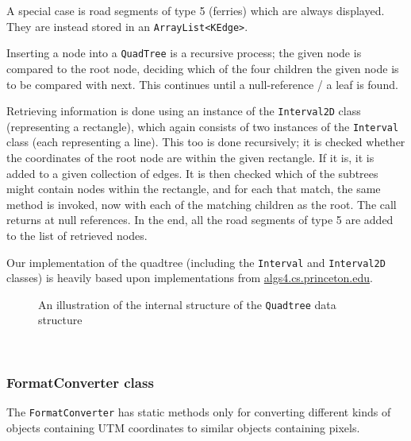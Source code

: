 A special case is road segments of type 5 (ferries) which are always displayed. They are instead stored in an \texttt{ArrayList<KEdge>}.

Inserting a node into a \texttt{QuadTree} is a recursive process; the given node is compared to the root node, deciding which of the four children the given node is to be compared with next. This continues until a null-reference / a leaf is found.

Retrieving information is done using an instance of the \texttt{Interval2D} class (representing a rectangle), which again consists of two instances of the \texttt{Interval} class (each representing a line). This too is done recursively; it is checked whether the coordinates of the root node are within the given rectangle. If it is, it is added to a given collection of edges. It is then checked which of the subtrees might contain nodes within the rectangle, and for each that match, the same method is invoked, now with each of the matching children as the root. The call returns at null references. In the end, all the road segments of type 5 are added to the list of retrieved nodes.

Our implementation of the quadtree (including the \texttt{Interval} and \texttt{Interval2D} classes) is heavily based upon implementations from \url{algs4.cs.princeton.edu}.
\\
\begin{figure}[!h]
\centering
{}
	\caption{An illustration of the internal structure of the \texttt{Quadtree} data structure}
\end{figure}
\\
\subsubsection{FormatConverter class} %
The \texttt{FormatConverter} has static methods only for converting different kinds of objects containing UTM coordinates to similar objects containing pixels.


